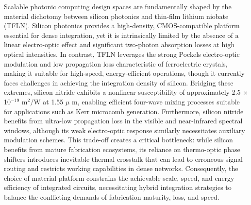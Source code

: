 \documentclass[11pt]{article}
\begin{document}
Scalable photonic computing design spaces are fundamentally shaped by the material dichotomy between silicon photonics and thin-film lithium niobate (TFLN). Silicon photonics provides a high-density, CMOS-compatible platform essential for dense integration, yet it is intrinsically limited by the absence of a linear electro-optic effect and significant two-photon absorption losses at high optical intensities. \citep{doi_10_3390_photonics11040375_bd102ef0} \citep{doi_10_3390_photonics12010005_5e399e5f} In contrast, TFLN leverages the strong Pockels electro-optic modulation and low propagation loss characteristic of ferroelectric crystals, making it suitable for high-speed, energy-efficient operations, though it currently faces challenges in achieving the integration density of silicon. \citep{doi_10_3390_photonics12111129_03f4b6cd} \citep{doi_10_3390_mi17060751_d3932b5d} Bridging these extremes, silicon nitride exhibits a nonlinear susceptibility of approximately 2.5 \(\times\) 10\(^{-19}\) m\(^{2}\)/W at 1.55 \(\mu\) m, enabling efficient four-wave mixing processes suitable for applications such as Kerr microcomb generation. Furthermore, silicon nitride benefits from ultra-low propagation loss in the visible and near-infrared spectral windows, although its weak electro-optic response similarly necessitates auxiliary modulation schemes. This trade-off creates a critical bottleneck: while silicon benefits from mature fabrication ecosystems, its reliance on thermo-optic phase shifters introduces inevitable thermal crosstalk that can lead to erroneous signal routing and restricts working capabilities in dense networks. Consequently, the choice of material platform constrains the achievable scale, speed, and energy efficiency of integrated circuits, necessitating hybrid integration strategies to balance the conflicting demands of fabrication maturity, loss, and speed. \citep{doi_10_48550_arxiv_2209_10098_b3bedb78} \citep{doi_10_1126_science_abj4396_40f36a09} \citep{doi_10_1149_ma2026_01311465mtgabs_643e381a} \citep{doi_10_1109_access_2020_3013116_8fec1fb2}
\end{document}
